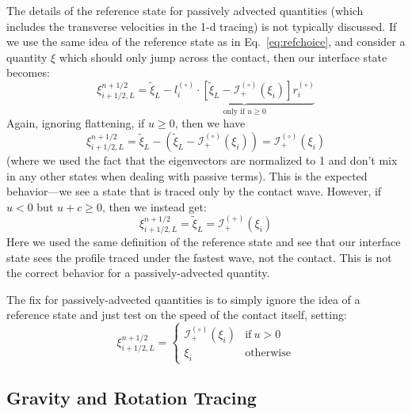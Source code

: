 \documentclass[iop]{emulateapj}
\newcommand{\evz}{{(\circ)}}
\newcommand{\evp}{{(+)}}
\begin{document}
The details of the reference state for passively advected quantities 
(which includes the transverse velocities in the 1-d tracing) is not
typically discussed.  If we use the same idea of the reference state as
in Eq.~\ref{eq:refchoice}, and consider a quantity $\xi$ which should only
jump across the contact, then our interface state becomes:
\begin{equation}
\xi_{i+1/2,L}^{n+1/2} = \tilde{\xi}_L -
  \underbrace{l_i^\evz \cdot \left [
        \tilde{\xi}_L  - \mathcal{I}^\evz_+(\xi_i)
       \right ] r_i^\evz}_{\text{only if~$u \ge 0$}}
\end{equation}
Again, ignoring flattening, if $u \ge 0$, then we have
\begin{equation}
\xi_{i+1/2,L}^{n+1/2} = \tilde{\xi}_L -
  \left (\tilde{\xi}_L  - \mathcal{I}^\evz_+(\xi_i) \right ) = \mathcal{I}^\evz_+(\xi_i)
\end{equation}
(where we used the fact that the eigenvectors are normalized to 1 and
don't mix in any other states when dealing with passive terms).  This
is the expected behavior---we see a state that is traced only by the
contact wave.  However, if $u < 0$ but $u + c \ge 0$, then we instead get:
\begin{equation}
\xi_{i+1/2,L}^{n+1/2} = \tilde{\xi}_L = \mathcal{I}^\evp_+(\xi_i)
\end{equation}
Here we used the same definition of the reference state and see that our
interface state sees the profile traced under the fastest wave, not the
contact.  This is not the correct behavior for a passively-advected
quantity.  

The fix for passively-advected quantities is to simply ignore the 
idea of a reference state and just test on the speed of the contact
itself, setting:
\begin{equation}
\xi_{i+1/2,L}^{n+1/2} = \left \{ \begin{array}{cc}
       \mathcal{I}_+^\evz(\xi_i) & \mathrm{if~} u  > 0 \\
       \xi_i                    & \mathrm{otherwise}
\end{array}
\right .
\end{equation}



\subsection{Gravity and Rotation Tracing}
\end{document}
